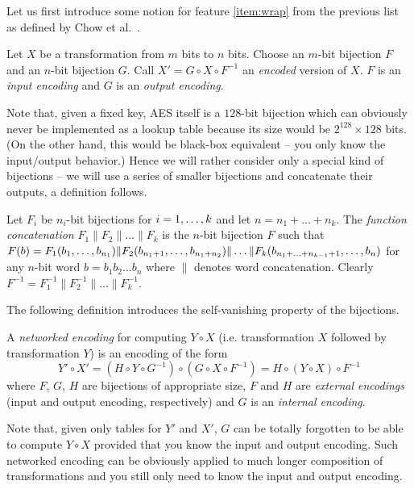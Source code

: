 Let us first introduce some notion for feature \ref{item:wrap} from the previous list as defined by Chow et al.\ \cite{chow2003aes}.

\begin{defn}[Encoding]
	Let $X$ be a transformation from $m$ bits to $n$ bits. Choose an $m$-bit bijection $F$ and an $n$-bit bijection $G$. Call $X' = G \circ X \circ F^{-1}$ an {\em encoded} version of $X$. $F$ is an {\em input encoding} and $G$ is an {\em output encoding}.
\end{defn}

Note that, given a fixed key, AES itself is a $128$-bit bijection which can obviously never be implemented as a lookup table because its size would be $2^{128}\times 128$ bits. (On the other hand, this would be black-box equivalent -- you only know the input/output behavior.) Hence we will rather consider only a special kind of bijections -- we will use a series of smaller bijections and concatenate their outputs, a definition follows.

\begin{defn}
\label{def:concat}
	Let $F_i$ be $n_i$-bit bijections for $i=1 , \ldots , k$ and let $n = n_1 + \ldots + n_k$. The {\em function concatenation} $F_1 \| F_2 \| \ldots \| F_k$ is the $n$-bit bijection $F$ such that $F(b) = F_1(b_1 , \ldots , b_{n_1})\| F_2(b_{n_1+1} , \ldots , b_{n_1+n_2})\|\ldots\| F_k(b_{n_1+\ldots+n_{k-1}+1} , \ldots , b_n)$ for any $n$-bit word $b=b_1b_2\ldots b_n$ where $\|$ denotes word concatenation. Clearly $F^{-1} = F_1^{-1}\| F_2^{-1}\| \ldots \|F_k^{-1}$.
\end{defn}

The following definition introduces the self-vanishing property of the bijections.

\begin{defn}
\label{def:netw}
	A {\em networked encoding} for computing $Y\circ X$ (i.e. transformation $X$ followed by transformation $Y$) is an encoding of the form
	\[
		Y'\circ X' = (H\circ Y\circ G^{-1})\circ(G\circ X\circ F^{-1}) = H\circ(Y\circ X)\circ F^{-1}
	\]
	where $F$, $G$, $H$ are bijections of appropriate size, $F$ and $H$ are {\em external encodings} (input and output encoding, respectively) and $G$ is an {\em internal encoding}.
\end{defn}

Note that, given only tables for $Y'$ and $X'$, $G$ can be totally forgotten to be able to compute $Y\circ X$ provided that you know the input and output encoding. Such networked encoding can be obviously applied to much longer composition of transformations and you still only need to know the input and output encoding.   %


